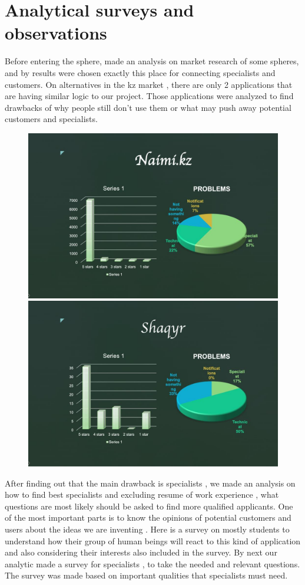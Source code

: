 \section{Analytical surveys and observations}
\hspace{7mm}Before entering the sphere, made an analysis on market research of some spheres, and by results were chosen exactly this place for connecting specialists and customers. On alternatives in the kz market , there are only 2 applications that are having similar logic to our project. Those applications were analyzed to find drawbacks of why people still don’t use them or what may push away potential customers and specialists. 
\begin{figure}[H]
    \centering
    \includegraphics[scale=0.45]{images/naimikz.png}
    \includegraphics[scale=0.45]{images/shaqyr.png}
\end{figure}
After finding out that the main drawback is specialists , we made an analysis on how to find best specialists and excluding resume of work experience , what questions are most likely should be asked to find more qualified applicants. One of the most important parts is to know the opinions of potential customers and users about the ideas we are inventing . Here is a survey on mostly students to understand how their group of human beings will react to this kind of application and also considering their interests also included in the survey. By next our analytic made a survey for specialists , to take the needed and relevant questions. The survey was made based on important qualities that specialists must need.
